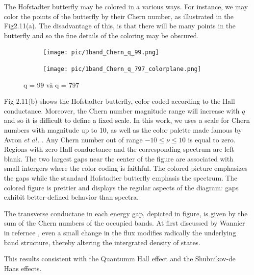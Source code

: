 \documentclass{report}
\begin{document}
The Hofstadter butterfly may be colored in a various ways. For instance, we may color the points of the butterfly by their Chern number, as illustrated in the Fig2.11(a). The disadvantage of this, is that there will be many points in the butterfly and so the fine details of the coloring may be obscured.
\begin{figure}[htb]
	\centering
	\begin{subfigure}[b]{0.495\textwidth}
		\centering
		{\texttt{[image: pic/1band\_Chern\_q\_99.png]}}
	\end{subfigure}
	\begin{subfigure}[b]{0.495\textwidth}
		\centering
		\texttt{[image: pic/1band\_Chern\_q\_797\_colorplane.png]}
	\end{subfigure}
	\caption{
		q = 99 và q = 797
	}
\end{figure}

Fig 2.11(b) shows the Hofstadter butterfly, color-coded according to the Hall conductance. Moreover, the Chern number magnitude range will increase with $q$ and so it is difficult to define a fixed scale. In this work, we uses a scale for Chern numbers with magnitude up to 10, as well as the color palette made famous by Avron $et \; al.$ \cite{avron2003}. Any Chern number out of range $-10 \leq \nu \leq 10$ is equal to zero. Regions with zero Hall conductance and the corresponding spectrum are left blank. The two largest gaps near the center of the figure are associated with small intergers where the color coding is faithful. The colored picture emphasizes the gaps while the standard Hofstadter butterfly emphasis the spectrum. The colored figure is prettier and displays the regular aspects of the diagram: gaps exhibit better-defined behavior than spectra.

The transverse conductane in each energy gap, depicted in figure, is given by the sum of the Chern numbers of the occupied bands. At first discussed by Wannier in refernce \cite{wannier1978}, even a small change in the flux modifies radically the underlying band structure, thereby altering the intergrated density of states.

This results consistent with the Quantumm Hall effect and the Shubnikov-de Haas effects.
\end{document}
